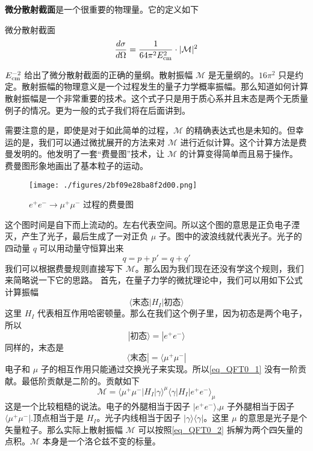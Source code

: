 \textbf{微分散射截面}是一个很重要的物理量。它的定义如下
\begin{definition}{微分散射截面}
\begin{equation}\label{eq_QFT0_3}
\frac{d\sigma}{d\Omega} = \frac{1}{64\pi^2E_{\rm cm}^2}\cdot |\mathcal M|^2
\end{equation}
\end{definition}
$E_{\rm cm}^{-2}$ 给出了微分散射截面的正确的量纲。散射振幅 $\mathcal M$ 是无量纲的。$16\pi^2$ 只是约定。散射振幅的物理意义是一个过程发生的量子力学概率振幅。那么知道如何计算散射振幅是一个非常重要的技术。这个式子只是用于质心系并且末态是两个无质量例子的情况。更为一般的式子我们将在后面讲到。

需要注意的是，即使是对于如此简单的过程，$\mathcal M$ 的精确表达式也是未知的。但幸运的是，我们可以通过微扰展开的方法来对 $\mathcal M$ 进行近似计算。这个计算方法是费曼发明的。他发明了一套“费曼图”技术，让 $\mathcal M$ 的计算变得简单而且易于操作。
费曼图形象地画出了基本粒子的运动。

\begin{figure}[ht]
\centering
\texttt{[image: ./figures/2bf09e28ba8f2d00.png]}
\caption{$e^+e^-\rightarrow\mu^+\mu^-$ 过程的费曼图} \label{fig_QFT0_2}
\end{figure}

这个图时间是自下而上流动的。左右代表空间。所以这个图的意思是正负电子湮灭，产生了光子，最后生成了一对正负 $\mu$ 子。图中的波浪线就代表光子。光子的四动量 $q$ 可以用动量守恒算出来
\begin{equation}
q=p+p'=q+q'
\end{equation}
我们可以根据费曼规则直接写下 $\mathcal M$。那么因为我们现在还没有学这个规则，我们来简略说一下它的思路。 首先，在量子力学的微扰理论中，我们可以用如下公式计算振幅
\begin{equation} \label{eq_QFT0_1}
\langle \text{末态} |H_I| \text{初态} \rangle
\end{equation}
这里 $H_I$ 代表相互作用哈密顿量。那么在我们这个例子里，因为初态是两个电子，所以
\begin{equation}
| \text{初态} \rangle = | e^+ e^- \rangle
\end{equation}
同样的，末态是
\begin{equation}
\langle \text{末态} | = \langle \mu^+ \mu^- |
\end{equation}
电子和 $\mu$ 子的相互作用只能通过交换光子来实现。所以\autoref{eq_QFT0_1} 没有一阶贡献。最低阶贡献是二阶的。贡献如下
\begin{equation}\label{eq_QFT0_2}
\mathcal M = \langle \mu^+ \mu^- | H_I | \gamma \rangle^\mu \langle \gamma | H_I | e^+ e^- \rangle_\mu 
\end{equation}
这是一个比较粗糙的说法。电子的外腿相当于因子 $| e^+ e^- \rangle $,$\mu$ 子外腿相当于因子 $\langle \mu^+ \mu^- |$.顶点相当于是 $H_I$。光子内线相当于因子 $|\gamma\rangle\langle\gamma|$。这里 $\mu$ 的意思是光子是个矢量粒子。那么实际上散射振幅 $\mathcal M$ 可以按照\autoref{eq_QFT0_2} 拆解为两个四矢量的点积。$\mathcal M$ 本身是一个洛仑兹不变的标量。

